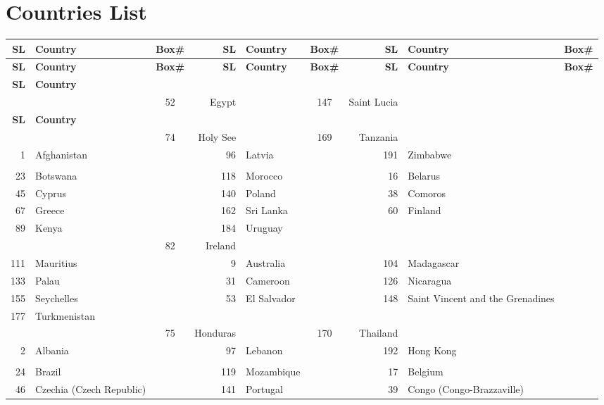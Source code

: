\documentclass[12pt,a4paper]{article}
\begin{document}
\section*{Countries List}

\setlength{\tabcolsep}{4pt}
\renewcommand{\arraystretch}{1.05}

\begin{longtable}{|r l c| r l c| r l c|}
\hline
\textbf{SL} & \textbf{Country} & \textbf{Box\#} &
\textbf{SL} & \textbf{Country} & \textbf{Box\#} &
\textbf{SL} & \textbf{Country} & \textbf{Box\#} \\ \hline
\endfirsthead
\hline
\textbf{SL} & \textbf{Country} & \textbf{Box\#} &
\textbf{SL} & \textbf{Country} & \textbf{Box\#} &
\textbf{SL} & \textbf{Country} & \textbf{Box\#} \\ \hline
\endhead
\textbf{SL} & \textbf{Country} \\ \hline &  & 52 & Egypt &  & 147 & Saint Lucia &  \\ \hline
\textbf{SL} & \textbf{Country} \\ \hline &  & 74 & Holy See &  & 169 & Tanzania &  \\ \hline
1 & Afghanistan &  & 96 & Latvia &  & 191 & Zimbabwe \\ \hline &  \\ \hline
23 & Botswana &  & 118 & Morocco &  & 16 & Belarus &  \\ \hline
45 & Cyprus &  & 140 & Poland &  & 38 & Comoros &  \\ \hline
67 & Greece &  & 162 & Sri Lanka &  & 60 & Finland &  \\ \hline
89 & Kenya &  & 184 & Uruguay \\ \hline &  & 82 & Ireland &  \\ \hline
111 & Mauritius &  & 9 & Australia &  & 104 & Madagascar &  \\ \hline
133 & Palau &  & 31 & Cameroon &  & 126 & Nicaragua &  \\ \hline
155 & Seychelles &  & 53 & El Salvador &  & 148 & Saint Vincent and the Grenadines &  \\ \hline
177 & Turkmenistan \\ \hline &  & 75 & Honduras &  & 170 & Thailand &  \\ \hline
2 & Albania &  & 97 & Lebanon &  & 192 & Hong Kong \\ \hline &  \\ \hline
24 & Brazil &  & 119 & Mozambique &  & 17 & Belgium &  \\ \hline
46 & Czechia (Czech Republic) &  & 141 & Portugal &  & 39 & Congo (Congo-Brazzaville) &  \\ \hline

\end{longtable}
\end{document}
